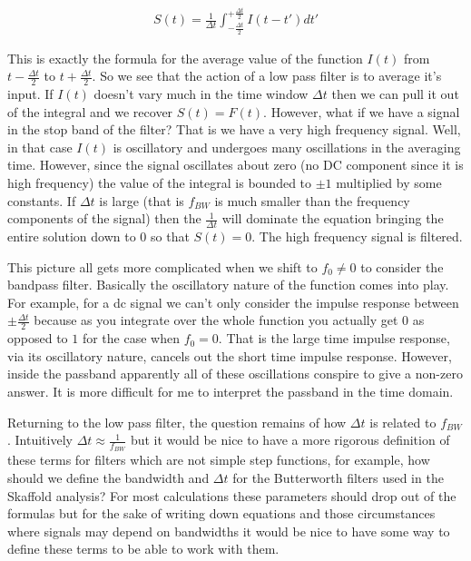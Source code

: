\documentclass[12pt]{article}
\begin{document}
\begin{align}
S(t) = \frac{1}{\Delta t}\int_{-\frac{\Delta t}{2}}^{+\frac{\Delta t}{2}} I(t-t')dt'
\end{align}

This is exactly the formula for the average value of the function $I(t)$ from $t-\frac{\Delta t}{2}$ to $t+\frac{\Delta t}{2}$. So we see that the action of a low pass filter is to average it's input. If $I(t)$ doesn't vary much in the time window $\Delta t$ then we can pull it out of the integral and we recover $S(t) = F(t)$. However, what if we have a signal in the stop band of the filter? That is we have a very high frequency signal. Well, in that case $I(t)$ is oscillatory and undergoes many oscillations in the averaging time. However, since the signal oscillates about zero (no DC component since it is high frequency) the value of the integral is bounded to $\pm 1$ multiplied by some constants. If $\Delta t$ is large (that is $f_{BW}$ is much smaller than the frequency components of the signal) then the $\frac{1}{\Delta t}$ will dominate the equation bringing the entire solution down to 0 so that $S(t) = 0$. The high frequency signal is filtered.

This picture all gets more complicated when we shift to $f_0 \neq 0$ to consider the bandpass filter. Basically the oscillatory nature of the function comes into play. For example, for a dc signal we can't only consider the impulse response between $\pm \frac{\Delta t}{2}$ because as you integrate over the whole function you actually get $0$ as opposed to $1$ for the case when $f_0 = 0$. That is the large time impulse response, via its oscillatory nature, cancels out the short time impulse response. However, inside the passband apparently all of these oscillations conspire to give a non-zero answer. It is more difficult for me to interpret the passband in the time domain.

Returning to the low pass filter, the question remains of how $\Delta t$ is related to $f_{BW}$. Intuitively $\Delta t \approx \frac{1}{f_{BW}}$ but it would be nice to have a more rigorous definition of these terms for filters which are not simple step functions, for example, how should we define the bandwidth and $\Delta t$ for the Butterworth filters used in the Skaffold analysis? For most calculations these parameters should drop out of the formulas but for the sake of writing down equations and those circumstances where signals may depend on bandwidths it would be nice to have some way to define these terms to be able to work with them.
\end{document}
